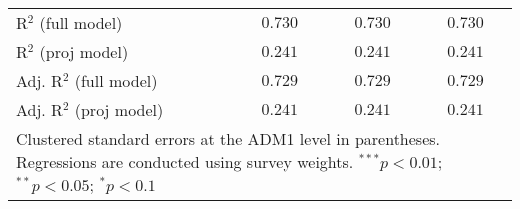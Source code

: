 \begin{table}[htbp]
\begin{center}
\begin{tabular}{l c c c}
R$^2$ (full model)                                    & $0.730$        & $0.730$        & $0.730$        \\
R$^2$ (proj model)                                    & $0.241$        & $0.241$        & $0.241$        \\
Adj. R$^2$ (full model)                               & $0.729$        & $0.729$        & $0.729$        \\
Adj. R$^2$ (proj model)                               & $0.241$        & $0.241$        & $0.241$        \\
\hline
\multicolumn{4}{l}{\scriptsize{Clustered standard errors at the ADM1 level in parentheses. Regressions are conducted using survey weights. $^{***}p<0.01$; $^{**}p<0.05$; $^{*}p<0.1$}}
\end{tabular}
\label{main: tableA13}
\end{center}
\end{table}
